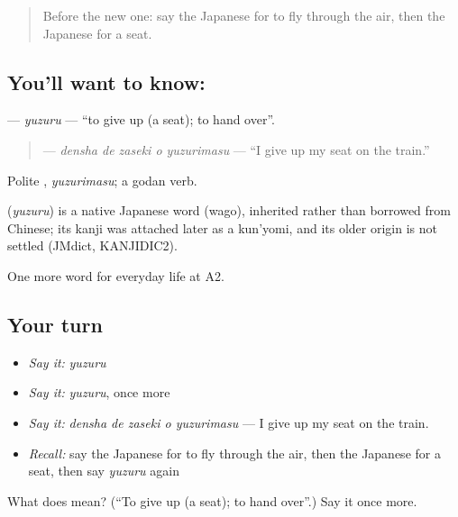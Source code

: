 \label{lesson:JA-C203-yuzuru}



\begin{quote}
Before the new one: say the Japanese for to fly through the air, then the Japanese for a seat.
\end{quote}

\subsection*{You'll want to know: }
\textbf{} — \emph{yuzuru} — \textquotedblleft{}to give up (a seat); to hand over\textquotedblright{}.

\begin{quote}
\textbf{  } — \emph{densha de zaseki o yuzurimasu} — \textquotedblleft{}I give up my seat on the train.\textquotedblright{}
\end{quote}

Polite \textbf{}, \emph{yuzurimasu}; a godan verb.

\begin{cousinweb}
\textbf{} (\emph{yuzuru}) is a native Japanese word (wago), inherited rather than borrowed from Chinese; its kanji was attached later as a kun'yomi, and its older origin is not settled (JMdict, KANJIDIC2).
\end{cousinweb}

\begin{grammarlens}[title={What you've built}]
One more word for everyday life at A2.
\end{grammarlens}

\subsection*{Your turn}
\begin{itemize}
\raggedright
  \item \emph{Say it:} \emph{yuzuru}
  \item \emph{Say it:} \emph{yuzuru}, once more
  \item \emph{Say it:} \emph{densha de zaseki o yuzurimasu} — I give up my seat on the train.
  \item \emph{Recall:} say the Japanese for to fly through the air, then the Japanese for a seat, then say \emph{yuzuru} again
\end{itemize}

\begin{tcolorbox}[breakable,colback=teal!4,colframe=teal!35!black,title={Before you move on}]
What does  mean? (\textquotedblleft{}To give up (a seat); to hand over\textquotedblright{}.) Say it once more.
\end{tcolorbox}
